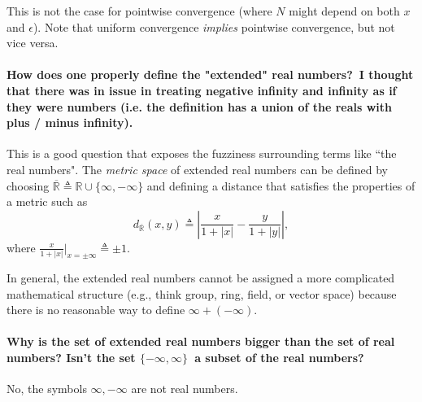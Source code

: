 \documentclass[10pt,english]{article}
\begin{document}
This is not the case for pointwise convergence (where $N$ might depend on both $x$ and $\epsilon$).
Note that uniform convergence \textit{implies} pointwise convergence, but not vice versa.




\paragraph{How does one properly define the "extended" real numbers? I thought that there was in issue in treating negative infinity and infinity as if they were numbers (i.e. the definition has a union of the reals with plus / minus infinity).}

This is a good question that exposes the fuzziness surrounding terms like ``the real numbers".
The \textit{metric space} of extended real numbers can be defined by choosing $\overline{\mathbb{R}} \triangleq \mathbb{R} \cup \{ \infty,-\infty\}$ and defining a distance that satisfies the properties of a metric such as
\[ d_{\overline{\mathbb{R}}} (x,y) \triangleq \left|\frac{x}{1+|x|} - \frac{y}{1+|y|} \right|, \]
where $\frac{x}{1+|x|}\big|_{x=\pm\infty} \triangleq \pm 1$.

In general, the extended real numbers cannot be assigned a more complicated mathematical structure (e.g., think group, ring, field, or vector space) because there is no reasonable way to define $\infty + (- \infty)$.

\paragraph{Why is the set of extended real numbers bigger than the set of real numbers? Isn't the set $\{-\infty, \infty\}$ a subset of the real numbers?}

No, the symbols $\infty,-\infty$ are not real numbers.
\end{document}
